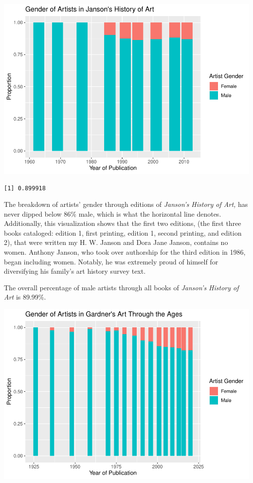 \documentclass[
  letterpaper,
  DIV=11,
  numbers=noendperiod]{scrreprt}
\begin{document}
\includegraphics{Chapter1/Chapter1_files/figure-pdf/jansongenderthroughtime-1.pdf}

\begin{verbatim}
[1] 0.899918
\end{verbatim}

The breakdown of artists' gender through editions of \emph{Janson's
History of Art,} has never dipped below 86\% male, which is what the
horizontal line denotes. Additionally, this visualization shows that the
first two editions, (the first three books cataloged: edition 1, first
printing, edition 1, second printing, and edition 2), that were written
my H. W. Janson and Dora Jane Janson, contains no women. Anthony Janson,
who took over authorship for the third edition in 1986, began including
women. Notably, he was extremely proud of himself for diversifying his
family's art history survey text.

The overall percentage of male artists through all books of
\emph{Janson's History of Art} is 89.99\%.

\includegraphics{Chapter1/Chapter1_files/figure-pdf/gardnergenderthroughtime-1.pdf}
\end{document}
